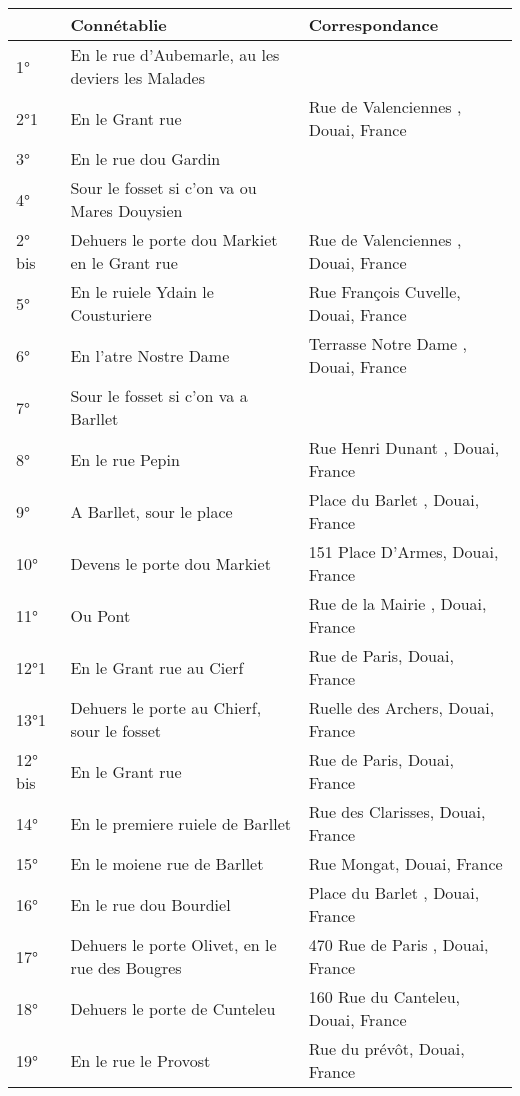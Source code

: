 \small
\begin{center}
\begin{longtable}{|l|p{6.5cm}|p{6.5cm}|}
\hline		&	\textbf{Connétablie}	&	\textbf{Correspondance}	\\
\hline
\hline	1°	&	En le rue d'Aubemarle, au les deviers les Malades	&		\\
\hline	2°1	&	En le Grant rue	&	Rue de Valenciennes , Douai, France	\\
\hline	3°	&	En le rue dou Gardin	&		\\
\hline	4°	&	Sour le fosset si c'on va ou Mares Douysien	&		\\
\hline	2° bis	&	Dehuers le porte dou Markiet en le Grant rue	&	Rue de Valenciennes , Douai, France	\\
\hline	5°	&	En le ruiele Ydain le Cousturiere	&	 Rue François Cuvelle, Douai, France	\\
\hline	6°	&	En l'atre Nostre Dame	&	Terrasse Notre Dame , Douai, France	\\
\hline	7°	&	Sour le fosset si c'on va a Barllet	&		\\
\hline	8°	&	En le rue Pepin	&	Rue Henri Dunant , Douai, France	\\
\hline	9°	&	A Barllet, sour le place	&	Place du Barlet , Douai, France	\\
\hline	10°	&	Devens le porte dou Markiet	&	 151 Place D'Armes, Douai, France	\\
\hline	11°	&	Ou Pont	&	Rue de la Mairie , Douai, France	\\
\hline	12°1	&	En le Grant rue au Cierf	&	 Rue de Paris, Douai, France	\\
\hline	13°1	&	Dehuers le porte au Chierf, sour le fosset	&	 Ruelle des Archers, Douai, France	\\
\hline	12° bis	&	En le Grant rue	&	 Rue de Paris, Douai, France	\\
\hline	14°	&	En le premiere ruiele de Barllet	&	 Rue des Clarisses, Douai, France	\\
\hline	15°	&	En le moiene rue de Barllet	&	 Rue Mongat, Douai, France	\\
\hline	16°	&	En le rue dou Bourdiel	&	Place du Barlet , Douai, France	\\
\hline	17°	&	Dehuers le porte Olivet, en le rue des Bougres	&	470 Rue de Paris , Douai, France	\\
\hline	18°	&	Dehuers le porte de Cunteleu	&	 160 Rue du Canteleu, Douai, France	\\
\hline	19°	&	En le rue le Provost	&	 Rue du prévôt, Douai, France	\\

\end{longtable}
\end{center}
